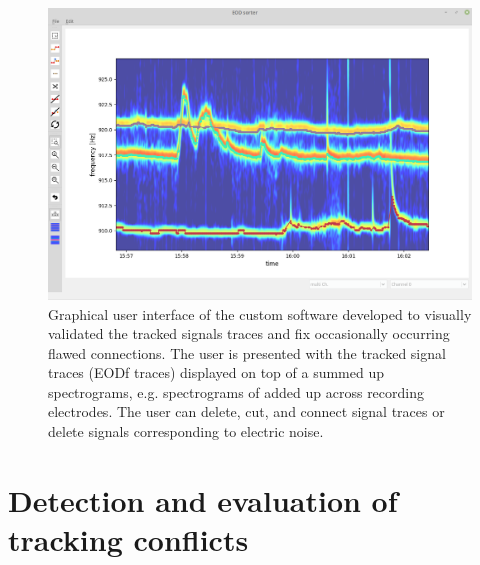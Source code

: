 \documentclass[11pt,pdftex]{article}
\begin{document}
\begin{figure}[h!]
  \centerline{\includegraphics[width=.9\linewidth]{signal_tracker_GUI}}
  \caption{\label{GUI} Graphical user interface of the custom software developed to visually validated the tracked signals traces and fix occasionally occurring flawed connections. The user is presented with the tracked signal traces (EODf traces) displayed on top of a summed up spectrograms, e.g. spectrograms of added up across recording electrodes. The user can delete, cut, and connect signal traces or delete signals corresponding to electric noise. }
\end{figure}

\section{Detection and evaluation of tracking conflicts}
\end{document}
